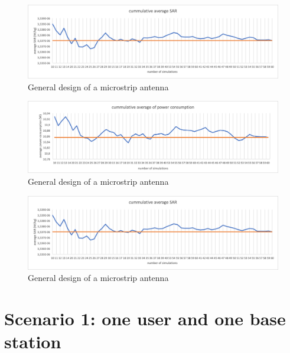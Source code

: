 \begin{figure}[th!]
  \includegraphics[width=\textwidth]{../results/numberOfSim/sarvssim.png}
  \caption{General design of a microstrip antenna}
  \label{fig:fhsar}
\end{figure}
\begin{figure}[th!]
  \includegraphics[width=\textwidth]{../results/numberOfSim/pcvssim.png}
  \caption{General design of a microstrip antenna}
  \label{fig:fhsar}
\end{figure}
\begin{figure}[th!]
  \includegraphics[width=\textwidth]{../results/numberOfSim/sarvssim.png}
  \caption{General design of a microstrip antenna}
  \label{fig:fhsar}
\end{figure}
\fi %
\section{Scenario 1: one user and one base station}

